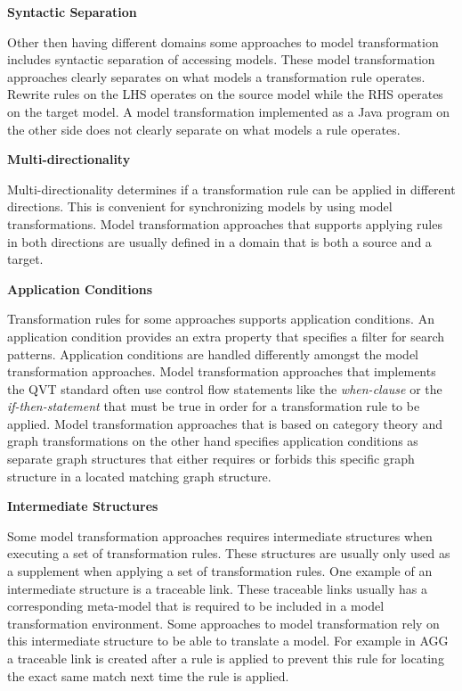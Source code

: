 \textbf{Syntactic Separation}

Other then having different domains some approaches to model transformation
includes syntactic separation of accessing models. These model transformation
approaches clearly separates on what models a transformation rule operates.
Rewrite rules on the LHS operates on the source model while the RHS
operates on the target model. A model transformation implemented
as a Java program on the other side does not clearly separate on what models a
rule operates.

\textbf{Multi-directionality}

Multi-directionality determines if a transformation rule can be applied in
different directions. This is convenient for synchronizing models by using model
transformations. Model transformation approaches that supports
applying rules in both directions are usually defined in a domain that is
both a source and a target.


\textbf{Application Conditions}

Transformation rules for some approaches supports application conditions. An
application condition provides an extra property that specifies a filter for
search patterns. Application conditions are handled differently amongst the
model transformation approaches. Model transformation approaches that implements
the QVT standard often use control flow statements like the \textit{when-clause}
or the \textit{if-then-statement} that must be true in order for a
transformation rule to be applied. Model transformation approaches that is
based on category theory and graph transformations on the other hand specifies
application conditions as separate graph structures that either requires or
forbids this specific graph structure in a located matching graph structure. 

\textbf{Intermediate Structures}

Some model transformation approaches requires intermediate structures when
executing a set of transformation rules. These structures are usually only
used as a supplement when applying a set of transformation rules. One
example of an intermediate structure is a traceable link. These traceable links
usually has a corresponding meta-model that is required to be included in a
model transformation environment. Some approaches to model transformation rely
on this intermediate structure to be able to translate a model. For example in
AGG a traceable link is created after a rule is applied to prevent this rule for
locating the exact same match next time the rule is applied.

